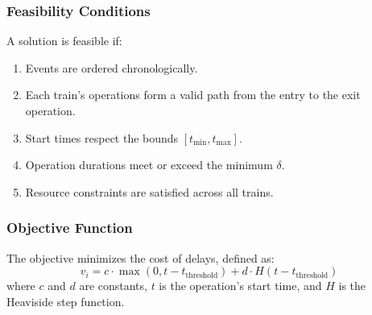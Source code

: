 \documentclass[runningheads]{llncs}
\begin{document}
\subsubsection{Feasibility Conditions}
A solution is feasible if:
\begin{enumerate}
    \item Events are ordered chronologically.
    \item Each train's operations form a valid path from the entry to the exit operation.
    \item Start times respect the bounds $[t_{\text{min}}, t_{\text{max}}]$.
    \item Operation durations meet or exceed the minimum $\delta$.
    \item Resource constraints are satisfied across all trains.
\end{enumerate}

\subsubsection{Objective Function}
The objective minimizes the cost of delays, defined as:
\[
v_i = c \cdot \max(0, t - t_{\text{threshold}}) + d \cdot H(t - t_{\text{threshold}})
\]
where $c$ and $d$ are constants, $t$ is the operation's start time, and $H$ is the Heaviside step function.
\end{document}
